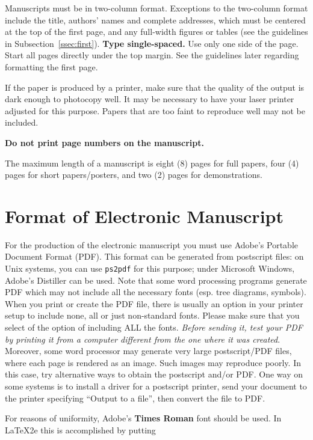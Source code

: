 \documentclass[10pt]{article}
\begin{document}
Manuscripts must be in two-column format.  Exceptions to the
two-column format include the title, authors' names and complete
addresses, which must be centered at the top of the first page, and
any full-width figures or tables (see the guidelines in
Subsection~\ref{ssec:first}).
{\bf Type single-spaced.}  Use only one side of the page. Start
all pages directly under the top margin.  See the guidelines later
regarding formatting the first page. 

If the paper is produced by a printer, make sure that the quality
of the output is dark enough to photocopy well.  It may be necessary
to have your laser printer adjusted for this purpose.  Papers that are too
faint to reproduce well may not be included.

{\bf Do not print page numbers on the manuscript.}

The maximum length of a manuscript is eight ($8$) pages for full
papers, four (4) pages for short papers/posters, and two (2) pages
for demonstrations.

\section{Format of Electronic Manuscript}
\label{sect:pdf}

For the production of the electronic manuscript you must use Adobe's
Portable Document Format (PDF). This format can be generated from
postscript files: on Unix systems, you can use {\tt ps2pdf} for this
purpose; under Microsoft Windows, Adobe's Distiller can be used.  Note
that some word processing programs generate PDF which may not include
all the necessary fonts (esp. tree diagrams, symbols). When you print
or create the PDF file, there is usually an option in your printer
setup to include none, all or just non-standard fonts.  Please make
sure that you select of the option of including ALL the fonts.  {\em
  Before sending it, test your {\/\em PDF} by printing it from a
  computer different from the one where it was created}. Moreover,
some word processor may generate very large postscript/PDF files,
where each page is rendered as an image. Such images may reproduce
poorly.  In this case, try alternative ways to obtain the postscript
and/or PDF.  One way on some systems is to install a driver for a
postscript printer, send your document to the printer specifying
``Output to a file'', then convert the file to PDF.

For reasons of uniformity, Adobe's {\bf Times Roman} font should be
used. In \LaTeX2e{} this is accomplished by putting
\end{document}
